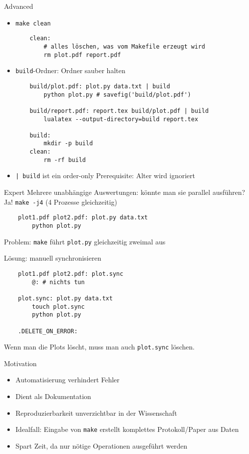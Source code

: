 \begin{frame}[fragile]{Advanced}
  \begin{itemize}
    \item \texttt{make clean}
      \begin{verbatim}
    clean:
        # alles löschen, was vom Makefile erzeugt wird
        rm plot.pdf report.pdf
      \end{verbatim}
    \item \texttt{build}-Ordner: Ordner sauber halten
      \begin{verbatim}
    build/plot.pdf: plot.py data.txt | build
        python plot.py # savefig('build/plot.pdf')

    build/report.pdf: report.tex build/plot.pdf | build
        lualatex --output-directory=build report.tex

    build:
        mkdir -p build
    clean:
        rm -rf build
      \end{verbatim}
    \item \texttt{| build} ist ein order-only Prerequisite: Alter wird ignoriert
  \end{itemize}
\end{frame}

\begin{frame}[fragile]{Expert}
  Mehrere unabhängige Auswertungen: könnte man sie parallel ausführen? \\
  Ja! \texttt{make -j4} (4 Prozesse gleichzeitig)

  \begin{verbatim}
    plot1.pdf plot2.pdf: plot.py data.txt
        python plot.py
  \end{verbatim}

  Problem: \texttt{make} führt \texttt{plot.py} gleichzeitig zweimal aus

  Lösung: manuell synchronisieren

  \begin{verbatim}
    plot1.pdf plot2.pdf: plot.sync
        @: # nichts tun

    plot.sync: plot.py data.txt
        touch plot.sync
        python plot.py

    .DELETE_ON_ERROR:
  \end{verbatim}

  Wenn man die Plots löscht, muss man auch \texttt{plot.sync} löschen.
\end{frame}

\begin{frame}{Motivation}
  \begin{itemize}
    \item Automatisierung verhindert Fehler
    \item Dient als Dokumentation
    \item Reproduzierbarkeit unverzichtbar in der Wissenschaft
    \item Idealfall: Eingabe von \texttt{make} erstellt komplettes Protokoll/Paper aus Daten
    \item Spart Zeit, da nur nötige Operationen ausgeführt werden
  \end{itemize}
\end{frame}
